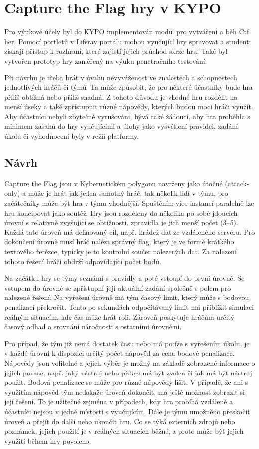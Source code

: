 \documentclass[
  digital, %
  oneside, %
  table,   %
  nolof,     %
  nolot,     %
]{fithesis3}
\begin{document}
\section{Capture the Flag hry v KYPO}
Pro výukové účely byl do KYPO implementován modul pro vytváření a běh Ctf her. Pomocí portletů v Liferay portálu mohou vyučující hry spravovat a studenti získají přístup k rozhraní, které zajistí jejich průchod skrze hru. Také byl vytvořen prototyp hry zaměřený na výuku penetračního testování.\par
Při návrhu je třeba brát v úvahu nevyváženost ve znalostech a schopnostech jednotlivých hráčů či týmů. Ta může způsobit, že pro některé účastníky bude hra příliš obtížná nebo příliš snadná. Z tohoto důvodu je vhodné hru rozdělit na menší úseky a také zpřístupnit různé nápovědy, kterých budou moci hráči využít. Aby účastníci nebyli zbytečně vyrušováni, bývá také žádoucí, aby hra proběhla s minimem zásahů do hry vyučujícími a úlohy jako vysvětlení pravidel, zadání úkolu či vyhodnocení byly v režii platformy.\cite{ctfDesign} 
\subsection{Návrh} \label{gameDesign}
Capture the Flag jsou v Kybernetickém polygonu navrženy jako útočné (attack-only) a může je hrát jak jeden samotný hráč, tak několik lidí v týmu, pro začátečníky může být hra v týmu vhodnější. Spuštěním více instancí paralelně lze hru koncipovat jako soutěž. Hry jsou rozděleny do několika po sobě jdoucích úrovní s relativně zvyšující se obtížností, zpravidla je jich menší počet (3–5). Každá tato úroveň má definovaný cíl, např. krádež dat ze vzdáleného serveru. Pro dokončení úrovně musí hráč nalézt správný flag, který je ve formě krátkého textového řetězce, typicky je to kontrolní součet nalezených dat. Za nalezení tohoto řešení hráči obdrží odpovídající počet bodů.\par
Na začátku hry se týmy seznámí s pravidly a poté vstoupí do první úrovně. Se vstupem do úrovně se zpřístupní její aktuální zadání společně s polem pro nalezené řešení. Na vyřešení úrovně má tým časový limit, který může s bodovou penalizací překročit. Tento po sekundách odpočítávaný limit má přiblížit simulaci reálným situacím, kde čas může hrát roli. Zároveň poskytuje hráčům určitý časový odhad a srovnání náročnosti s ostatními úrovněmi.\par
Pro případ, že tým již nemá dostatek času nebo má potíže s vyřešením úkolu, je v každé úrovni k dispozici určitý počet nápověd za cenu bodové penalizace. Nápovědy jsou volitelné a jejich výběr je možný na základě zobrazené informace o jejich povaze, např. jaký nástroj nebo příkaz má být zvolen či jak má být nástroj použit. Bodová penalizace se může pro různé nápovědy lišit. V případě, že ani s využitím nápověd tým nedokáže úroveň dokončit, má ještě možnost zobrazit si její řešení. To je užitečné zejména v případech, kdy hra probíhá vzdáleně a účastníci nejsou v jedné místosti s vyučujícím. Dále je týmu umožněno přeskočit úroveň a přejít do další nebo ukončit hru. Co se týká externích zdrojů nebo poznámek, jejich použití je v reálných situacích běžné, a proto může být jejich využití během hry povoleno. \cite{ctfDesign}\par
\end{document}
